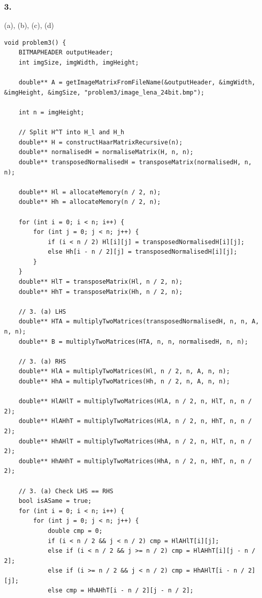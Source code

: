 \subsubsection{3.} (a), (b), (c), (d)
\begin{verbatim}
void problem3() {
    BITMAPHEADER outputHeader;
    int imgSize, imgWidth, imgHeight;

    double** A = getImageMatrixFromFileName(&outputHeader, &imgWidth, &imgHeight, &imgSize, "problem3/image_lena_24bit.bmp");

    int n = imgHeight;

    // Split H^T into H_l and H_h
    double** H = constructHaarMatrixRecursive(n);
    double** normalisedH = normaliseMatrix(H, n, n);
    double** transposedNormalisedH = transposeMatrix(normalisedH, n, n);

    double** Hl = allocateMemory(n / 2, n);
    double** Hh = allocateMemory(n / 2, n);

    for (int i = 0; i < n; i++) {
        for (int j = 0; j < n; j++) {
            if (i < n / 2) Hl[i][j] = transposedNormalisedH[i][j];
            else Hh[i - n / 2][j] = transposedNormalisedH[i][j];
        }
    }
    double** HlT = transposeMatrix(Hl, n / 2, n);
    double** HhT = transposeMatrix(Hh, n / 2, n);

    // 3. (a) LHS
    double** HTA = multiplyTwoMatrices(transposedNormalisedH, n, n, A, n, n);
    double** B = multiplyTwoMatrices(HTA, n, n, normalisedH, n, n);

    // 3. (a) RHS
    double** HlA = multiplyTwoMatrices(Hl, n / 2, n, A, n, n);
    double** HhA = multiplyTwoMatrices(Hh, n / 2, n, A, n, n);

    double** HlAHlT = multiplyTwoMatrices(HlA, n / 2, n, HlT, n, n / 2);
    double** HlAHhT = multiplyTwoMatrices(HlA, n / 2, n, HhT, n, n / 2);
    double** HhAHlT = multiplyTwoMatrices(HhA, n / 2, n, HlT, n, n / 2);
    double** HhAHhT = multiplyTwoMatrices(HhA, n / 2, n, HhT, n, n / 2);

    // 3. (a) Check LHS == RHS
    bool isASame = true;
    for (int i = 0; i < n; i++) {
        for (int j = 0; j < n; j++) {
            double cmp = 0;
            if (i < n / 2 && j < n / 2) cmp = HlAHlT[i][j];
            else if (i < n / 2 && j >= n / 2) cmp = HlAHhT[i][j - n / 2];
            else if (i >= n / 2 && j < n / 2) cmp = HhAHlT[i - n / 2][j];
            else cmp = HhAHhT[i - n / 2][j - n / 2];


\end{verbatim}
